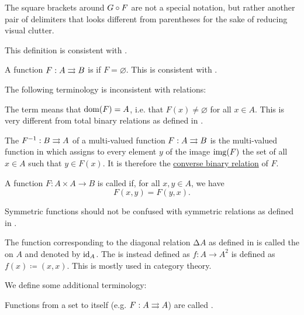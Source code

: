 \begin{definition}
\begin{thmenum}[resume=def:multi_valued_function]
    The square brackets around \( G \mathbin \circ F \) are not a special notation, but rather another pair of delimiters that looks different from parentheses for the sake of reducing visual clutter.

    This definition is consistent with .

     A function \( F: A \rightrightarrows B \) is  if \( F = \varnothing \). This is consistent with .
  \end{thmenum}

  The following terminology is inconsistent with relations:
  \begin{thmenum}[resume=def:multi_valued_function]
     The term  means that \( \operatorname{dom}(F) = A \), i.e. that \( F(x) \neq \varnothing \) for all \( x \in A \). This is very different from total binary relations as defined in .

     The  \( F^{-1}: B \rightrightarrows A \) of a multi-valued function \( F: A \rightrightarrows B \) is the multi-valued function in which assigns to every element \( y \) of the image \( \operatorname{img}(F) \) the set of all \( x \in A \) such that \( y \in F(x) \). It is therefore the \hyperref[def:binary_relation/converse]{converse binary relation} of \( F \).

     A function \( F: A \times A \to B \) is called  if, for all \( x, y \in A \), we have
    \begin{equation*}
      F(x, y) = F(y, x).
    \end{equation*}

    Symmetric functions should not be confused with symmetric relations as defined in .

     The function corresponding to the diagonal relation \( \increment A \) as defined in  is called the  on \( A \) and denoted by \( \operatorname{id}_A \). The  is instead defined as \( f: A \to A^2 \) is defined as \( f(x) \coloneqq (x, x) \). This is mostly used in category theory.
  \end{thmenum}

  We define some additional terminology:
  \begin{thmenum}[resume=def:multi_valued_function]
     Functions from a set to itself (e.g. \( F: A \rightrightarrows A \)) are called .


\end{thmenum}
\end{definition}
